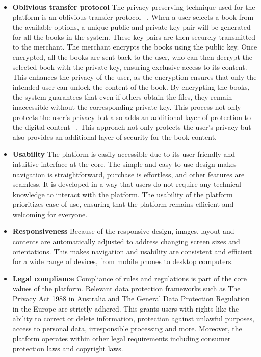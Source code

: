 \documentclass[12pt]{article}
\begin{document}
\begin{itemize}
	\item \textbf{Oblivious transfer protocol}
The privacy-preserving technique used for the platform is an oblivious transfer protocol ~\cite{noauthor}. When a user selects a book from the available options, a unique public and private key pair will be generated for all the books in the system. These key pairs are then securely transmitted to the merchant. The merchant encrypts the books using the public key. Once encrypted, all the books are sent back to the user, who can then decrypt the selected book with the private key, ensuring exclusive access to its content. This enhances the privacy of the user, as the encryption ensures that only the intended user can unlock the content of the book. By encrypting the books, the system guarantees that even if others obtain the files, they remain inaccessible without the corresponding private key. This process not only protects the user’s privacy but also adds an additional layer of protection to the digital content ~\cite{noauthor}. This approach not only protects the user's privacy but also provides an additional layer of security for the book content.
	\item \textbf{Usability}
	The platform is easily accessible due to its user-friendly and intuitive interface at the core. The simple and easy-to-use design makes navigation is straightforward, purchase is effortless, and other features are seamless. It is developed in a way that users do not require any technical knowledge to interact with the platform. The usability of the platform prioritizes ease of use, ensuring that the platform remains efficient and welcoming for everyone.
	\item \textbf{Responsiveness}
	Because of the responsive design, images, layout and contents are automatically adjusted to address changing screen sizes and orientations. This makes navigation and usability are consistent and efficient for a wide range of devices, from mobile phones to desktop computers. 
	\item \textbf{Legal compliance}
	Compliance of rules and regulations is part of the core values of the platform. Relevant data protection frameworks such as The Privacy Act 1988  in Australia and The General Data Protection Regulation in the Europe are strictly adhered. This grants users with rights like the ability to correct or delete information, protection against unlawful purposes, access to personal data, irresponsible processing and more. Moreover, the platform operates within other legal requirements including consumer protection laws and copyright laws.
	

\end{itemize}
\end{document}
